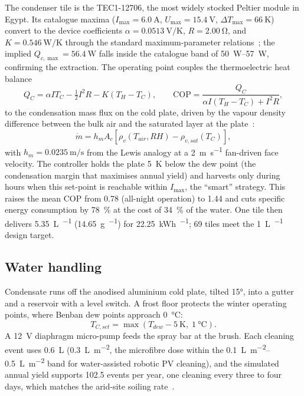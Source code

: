 \documentclass[11pt,a4paper]{article}
\begin{document}
The condenser tile is the TEC1-12706, the most widely stocked Peltier
module in Egypt. Its catalogue maxima
($I_{\max}=\SI{6.0}{\ampere}$, $U_{\max}=\SI{15.4}{\volt}$,
$\Delta T_{\max}=\SI{66}{\kelvin}$) convert to the device coefficients
$\alpha=\SI{0.0513}{\volt\per\kelvin}$, $R=\SI{2.00}{\ohm}$, and
$K=\SI{0.546}{\watt\per\kelvin}$ through the standard maximum-parameter
relations~\cite{zhao2022teccondenser,riffat2003peltier}; the implied
$Q_{c,\max}=\SI{56.4}{\watt}$ falls inside the catalogue band of
\SIrange{50}{57}{\watt}, confirming the extraction. The operating point
couples the thermoelectric heat balance
\begin{equation}
  Q_C = \alpha I T_C - \tfrac{1}{2}I^2 R - K(T_H - T_C),
  \qquad \mathrm{COP} = \frac{Q_C}{\alpha I (T_H-T_C) + I^2 R},
  \label{eq:tec}
\end{equation}
to the condensation mass flux on the cold plate, driven by the vapour
density difference between the bulk air and the saturated layer at the
plate~\cite{eslami2021tec,shourideh2021tec}:
\begin{equation}
  \dot m = h_m A_c \left[\rho_v(T_{air},RH) - \rho_{v,sat}(T_C)\right],
  \label{eq:mdot}
\end{equation}
with $h_m=\SI{0.0235}{\meter\per\second}$ from the Lewis analogy at a
\SI{2}{\meter\per\second} fan-driven face velocity. The controller holds
the plate \SI{5}{\kelvin} below the dew point (the condensation margin
that maximises annual yield) and harvests only during hours when this
set-point is reachable within $I_{\max}$, the ``smart'' strategy. This
raises the mean COP from \num{0.78} (all-night operation) to \num{1.44}
and cuts specific energy consumption by \SI{78}{\percent} at the cost of
\SI{34}{\percent} of the water. One tile then delivers
\SI{5.35}{\liter\per\year} (\SI{14.65}{\gram\per\dy}) for
\SI{22.25}{\kWh\per\year}; \num{69} tiles meet the
\SI{1}{\liter\per\dy} design target.

\subsection{Water handling}

Condensate runs off the anodised aluminium cold plate, tilted \ang{15},
into a gutter and a reservoir with a level switch. A frost floor
protects the winter operating points, where Benban dew points approach
\SI{0}{\degreeCelsius}:
\begin{equation}
  T_{C,set} = \max\!\left(T_{dew} - \SI{5}{\kelvin},\; \SI{1}{\degreeCelsius}\right).
  \label{eq:frost}
\end{equation}
A \SI{12}{\volt} diaphragm micro-pump feeds the spray bar at the brush.
Each cleaning event uses \SI{0.6}{\liter}
(\SI{0.3}{\liter\per\square\meter}, the microfibre dose within the
\SIrange{0.1}{0.5}{\liter\per\square\meter} band for water-assisted robotic
PV cleaning), and the simulated annual yield supports
\num{102.5} events per year, one cleaning every three to four days,
which matches the arid-site soiling rate~\cite{kazem2023soiling}.
\end{document}
